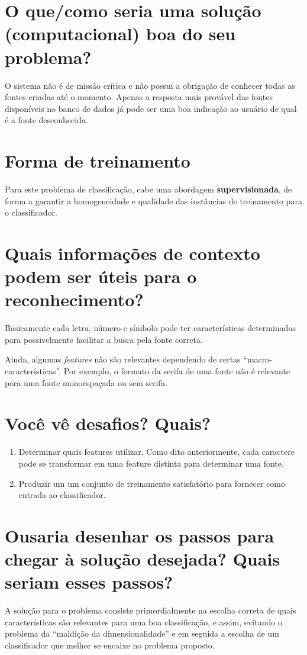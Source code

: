 \documentclass[brazil]{article}
\begin{document}
\section{O que/como seria uma solução (computacional) boa do seu problema?}
O sistema não é de missão crítica e não possui a obrigação de conhecer todas as
fontes criadas até o momento. Apenas a resposta mais provável das fontes 
disponíveis no banco de dados já pode ser uma boa indicação ao usuário de qual
é a fonte desconhecida.

\section{Forma de treinamento}
Para este problema de classificação, cabe uma abordagem \textbf{supervisionada},
de forma a garantir a homogeneidade e qualidade das instâncias de treinamento
para o classificador.


\section{Quais informações de contexto podem ser úteis para o reconhecimento?}
Basicamente cada letra, número e símbolo pode ter características determinadas
para possivelmente facilitar a busca pela fonte correta.

Ainda, algumas \emph{features} não são relevantes dependendo de certas 
``macro-características''. Por exemplo, o formato da serifa de uma fonte não é
relevante para uma fonte monoespaçada ou sem serifa.

\section{Você vê desafios? Quais?}
\begin{enumerate}
	\item Determinar quais features utilizar. Como dito anteriormente, cada 
	caractere pode se transformar em uma feature distinta para determinar uma 
	fonte.
	\item Produzir um um conjunto de treinamento satisfatório para fornecer como
	entrada ao classificador.
\end{enumerate}

\section{Ousaria desenhar os passos para chegar à solução desejada? Quais seriam esses passos?}
A solução para o problema consiste primordialmente na escolha correta de quais
características são relevantes para uma boa classificação, e assim, evitando
o problema da ``maldição da dimensionalidade'' e em seguida a escolha
de um classificador que melhor se encaixe no problema proposto.
\end{document}
